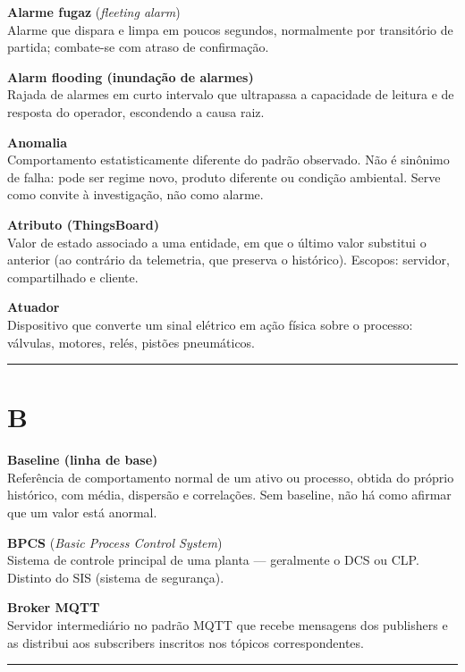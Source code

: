 \textbf{Alarme fugaz} (\emph{fleeting alarm})\\
Alarme que dispara e limpa em poucos segundos, normalmente por transitório de partida; combate-se com atraso de confirmação.

\textbf{Alarm flooding (inundação de alarmes)}\\
Rajada de alarmes em curto intervalo que ultrapassa a capacidade de leitura e de resposta do operador, escondendo a causa raiz.

\textbf{Anomalia}\\
Comportamento estatisticamente diferente do padrão observado. Não é sinônimo de falha: pode ser regime novo, produto diferente ou condição ambiental. Serve como convite à investigação, não como alarme.

\textbf{Atributo (ThingsBoard)}\\
Valor de estado associado a uma entidade, em que o último valor substitui o anterior (ao contrário da telemetria, que preserva o histórico). Escopos: servidor, compartilhado e cliente.

\textbf{Atuador}\\
Dispositivo que converte um sinal elétrico em ação física sobre o processo: válvulas, motores, relés, pistões pneumáticos.

\begin{center}\rule{0.5\linewidth}{0.5pt}\end{center}

\section{B}\label{b}

\textbf{Baseline (linha de base)}\\
Referência de comportamento normal de um ativo ou processo, obtida do próprio histórico, com média, dispersão e correlações. Sem baseline, não há como afirmar que um valor está anormal.

\textbf{BPCS} (\emph{Basic Process Control System})\\
Sistema de controle principal de uma planta --- geralmente o DCS ou CLP. Distinto do SIS (sistema de segurança).

\textbf{Broker MQTT}\\
Servidor intermediário no padrão MQTT que recebe mensagens dos publishers e as distribui aos subscribers inscritos nos tópicos correspondentes.

\begin{center}\rule{0.5\linewidth}{0.5pt}\end{center}

